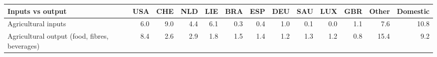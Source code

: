 \begin{tabular}{lrrrrrrrrrrrr}
\toprule
Inputs vs output & USA & CHE & NLD & LIE & BRA & ESP & DEU & SAU & LUX & GBR & Other & Domestic \\
\midrule
Agricultural inputs & 6.0 & 9.0 & 4.4 & 6.1 & 0.3 & 0.4 & 1.0 & 0.1 & 0.0 & 1.1 & 7.6 & 10.8 \\
Agricultural output (food, fibres, beverages) & 8.4 & 2.6 & 2.9 & 1.8 & 1.5 & 1.4 & 1.2 & 1.3 & 1.2 & 0.8 & 15.4 & 9.2 \\
\bottomrule
\end{tabular}
